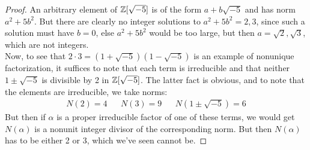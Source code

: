 \begin{proof}
    An arbitrary element of $\mathbb{Z}[\sqrt{-5}]$ is of the form $a+b\sqrt{-5}$ and has norm $a^2+5b^2$. But there are clearly no integer solutions to $a^2+5b^2 = 2,3$, since such a solution must have $b=0$, else $a^2+5b^2$ would be too large, but then $a = \sqrt{2},\sqrt{3}$, which are not integers. \\

    Now, to see that $2 \cdot 3 = (1+\sqrt{-5})(1-\sqrt{-5})$ is an example of nonunique factorization, it suffices to note that each term is irreducible and that neither $1 \pm \sqrt{-5}$ is divisible by 2 in $\mathbb{Z}[\sqrt{-5}]$. The latter fact is obvious, and to note that the elements are irreducible, we take norms:
    \begin{align*} N(2) = 4 && N(3) = 9 && N(1\pm\sqrt{-5}) = 6 \end{align*}
    But then if $\alpha$ is a proper irreducible factor of one of these terms, we would get $N(\alpha)$ is a nonunit integer divisor of the corresponding norm. But then $N(\alpha)$ has to be either 2 or 3, which we've seen cannot be.
\end{proof}
